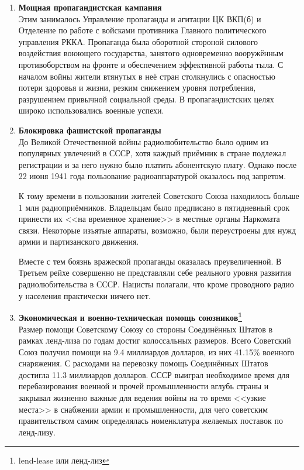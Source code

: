 \documentclass[12pt]{article}
\newcommand{\teal}[1]{\textcolor{teal}{#1}}
\begin{document}
\begin{enumerate}[label=\textbf{\large\arabic*}]
    \item \textbf{Мощная пропагандистская кампания} \\
    Этим занималось Управление пропаганды и агитации ЦК ВКП(б) и
    Отделение по работе с войсками противника Главного политического управления РККА.
    Пропаганда была оборотной стороной силового воздействия воюющего государства,
    занятого одновременно вооружённым противоборством на фронте и обеспечением эффективной работы тыла.
    С началом войны жители втянутых в неё стран столкнулись с опасностью потери здоровья и жизни,
    резким снижением уровня потребления, разрушением привычной социальной среды.
    В пропагандистских целях широко использовались военные успехи.

    \item \textbf{Блокировка фашистской пропаганды} \\
    До Великой Отечественной войны радиолюбительство было одним из популярных увлечений в СССР,
    хотя каждый приёмник в стране подлежал регистрации и за него нужно было платить абонентскую плату.
    Однако после 22 июня 1941 года пользование радиоаппаратурой оказалось под запретом.

    К тому времени в пользовании жителей Советского Союза находилось больше 1 млн радиоприёмников.
    Владельцам было предписано в пятидневный срок принести их <<на временное хранение>> в местные органы Наркомата связи.
    Некоторые изъятые аппараты, возможно, были переустроены для нужд армии и партизанского движения.

    Вместе с тем боязнь вражеской пропаганды оказалась преувеличенной.
    В Третьем рейхе совершенно не представляли себе реального уровня развития радиолюбительства в СССР.
    Нацисты полагали, что кроме проводного радио у населения практически ничего нет.

    \item \textbf{Экономическая и военно-техническая помощь союзников\footnote{lend-lease или ленд-лиз}} \\
    Размер помощи Советскому Союзу со стороны Соединённых Штатов в рамках ленд-лиза по годам достиг колоссальных размеров.
    Всего Советский Союз получил помощи на 9.4 миллиардов долларов, из них 41.15\% военного снаряжения.
    С расходами на перевозку помощь Соединённых Штатов достигла 11.3 миллиардов долларов.
    СССР выиграл необходимое время для перебазирования военной и прочей промышленности вглубь страны
    и закрывал жизненно важные для ведения войны на то время <<узкие места>> в снабжении армии и промышленности,
    для чего советским правительством самим определялась номенклатура желаемых поставок по ленд-лизу.


\end{enumerate}
\end{document}

